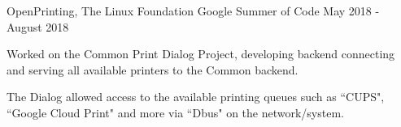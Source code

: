 \begin{cventries}

  \cventry
    {OpenPrinting, The Linux Foundation} %
    {Google Summer of Code} %
    {} %
    {May 2018 - August 2018} %
    {
      \begin{cvitems} %
        \item {Worked on the Common Print Dialog Project, developing backend connecting and serving all available printers to the Common backend.}
        \item {The Dialog allowed access to the available printing queues such as ``CUPS", ``Google Cloud Print" and more via ``Dbus" on the network/system.}
      \end{cvitems}
    }



\end{cventries}
